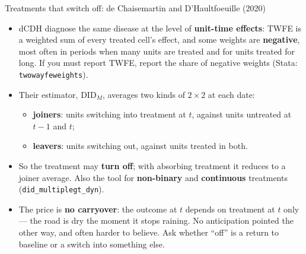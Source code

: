 \documentclass[
  11pt,
  ignorenonframetext,
  aspectratio=169,
]{beamer}
\providecommand{\tightlist}{%
  \setlength{\itemsep}{0pt}\setlength{\parskip}{0pt}}
\begin{document}
\begin{frame}[fragile]{Treatments that switch off: de Chaisemartin and
D'Haultfoeuille (2020)}
\protect{}\label{treatments-that-switch-off-de-chaisemartin-and-dhaultfoeuille-2020}
\begin{itemize}
\tightlist
\item
  dCDH diagnose the same disease at the level of \textbf{unit-time
  effects}: TWFE is a weighted sum of every treated cell's effect, and
  some weights are \textbf{negative}, most often in periods when many
  units are treated and for units treated for long. If you must report
  TWFE, report the share of negative weights (Stata:
  \texttt{twowayfeweights}).
\item
  Their estimator, \(\text{DID}_M\), averages two kinds of
  \(2 \times 2\) at each date:

  \begin{itemize}
  \tightlist
  \item
    \textbf{joiners}: units switching into treatment at \(t\), against
    units untreated at \(t-1\) and \(t\);
  \item
    \textbf{leavers}: units switching out, against units treated in
    both.
  \end{itemize}
\item
  So the treatment may \textbf{turn off}; with absorbing treatment it
  reduces to a joiner average. Also the tool for \textbf{non-binary} and
  \textbf{continuous} treatments (\texttt{did\_multiplegt\_dyn}).
\item
  The price is \textbf{no carryover}: the outcome at \(t\) depends on
  treatment at \(t\) only --- the road is dry the moment it stops
  raining. No anticipation pointed the other way, and often harder to
  believe. Ask whether ``off'' is a return to baseline or a switch into
  something else.
\end{itemize}
\end{frame}
\end{document}
